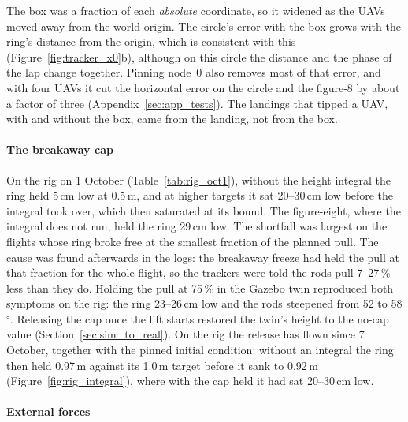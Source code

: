 The box was a fraction of each \emph{absolute} coordinate, so it widened as the UAVs moved away from
the world origin. The circle's error with the box grows with the ring's distance from the origin,
which is consistent with this (Figure~\ref{fig:tracker_x0}b), although on this circle the distance and
the phase of the lap change together. Pinning node~0 also removes most of that error, and with four UAVs
it cut the horizontal error on the circle and the figure-8 by about a factor of three
(Appendix~\ref{sec:app_tests}). The landings that tipped a UAV, with and without the box, came from the
landing, not from the box.


\paragraph{The breakaway cap}
\label{sec:res_cap}

On the rig on 1 October (Table~\ref{tab:rig_oct1}), without the height integral the ring held 5\,cm low at 0.5\,m, and at
higher targets it sat 20--30\,cm low before the integral took over, which then saturated at its bound.
The figure-eight, where the integral does not run, held the ring 29\,cm low. The shortfall was largest
on the flights whose ring broke free at the smallest fraction of the planned pull. The cause was
found afterwards in the logs: the breakaway freeze had held the pull at that fraction for the whole
flight, so the trackers were told the rods pull 7--27\,\% less than they do. Holding the pull at
75\,\% in the Gazebo twin reproduced both symptoms on the rig: the ring 23--26\,cm low and the rods
steepened from 52 to 58$^\circ$. Releasing the cap once the lift starts restored the twin's height
to the no-cap value (Section~\ref{sec:sim_to_real}). On the rig the release has flown since 7 October,
together with the pinned initial condition: without an integral the ring then held 0.97\,m against its 1.0\,m target before it sank to 0.92\,m
(Figure~\ref{fig:rig_integral}), where with the cap held it had sat 20--30\,cm low.

\paragraph{External forces}
\label{sec:res_force}

